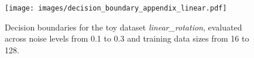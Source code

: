 \begin{figure}[t]
    \centering
    \texttt{[image: images/decision\_boundary\_appendix\_linear.pdf]}
    \caption{Decision boundaries for the toy dataset \textit{linear\_rotation}, evaluated across noise levels from 0.1 to 0.3 and training data sizes from 16 to 128.}
    \label{fig:decision_line}
\end{figure}


